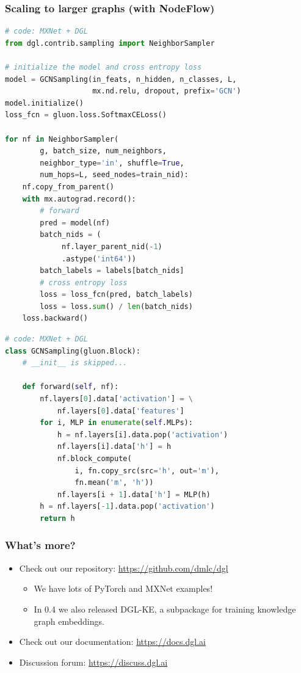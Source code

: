 \documentclass[10pt,aspectratio=169]{beamer}
\begin{document}
	\begin{frame}[fragile]
		\frametitle{Scaling to larger graphs (with NodeFlow)}
		\begin{minipage}{0.45\textwidth}
\begin{lstlisting}[language=Python]
# code: MXNet + DGL
from dgl.contrib.sampling import NeighborSampler

# initialize the model and cross entropy loss
model = GCNSampling(in_feats, n_hidden, n_classes, L,
                    mx.nd.relu, dropout, prefix='GCN')
model.initialize()
loss_fcn = gluon.loss.SoftmaxCELoss()

for nf in NeighborSampler(
        g, batch_size, num_neighbors,
        neighbor_type='in', shuffle=True,
        num_hops=L, seed_nodes=train_nid):
    nf.copy_from_parent()
    with mx.autograd.record():
        # forward
        pred = model(nf)
        batch_nids = (
             nf.layer_parent_nid(-1)
             .astype('int64'))
        batch_labels = labels[batch_nids]
        # cross entropy loss
        loss = loss_fcn(pred, batch_labels)
        loss = loss.sum() / len(batch_nids)
    loss.backward()
\end{lstlisting}
		\end{minipage}\hfill%
		\begin{minipage}{0.45\textwidth}
\begin{lstlisting}[language=Python]
# code: MXNet + DGL
class GCNSampling(gluon.Block):
    # __init__ is skipped...
    
    def forward(self, nf):
        nf.layers[0].data['activation'] = \
            nf.layers[0].data['features']
        for i, MLP in enumerate(self.MLPs):
            h = nf.layers[i].data.pop('activation')
            nf.layers[i].data['h'] = h
            nf.block_compute(
                i, fn.copy_src(src='h', out='m'),
                fn.mean('m', 'h'))
            nf.layers[i + 1].data['h'] = MLP(h)
        h = nf.layers[-1].data.pop('activation')
        return h
\end{lstlisting}
		\end{minipage}
	\end{frame}

	\begin{frame}
		\frametitle{What's more?}
		\begin{itemize}
			\item Check out our repository: \url{https://github.com/dmlc/dgl}
			\begin{itemize}
				\item We have lots of PyTorch and MXNet examples!
				\item In 0.4 we also released DGL-KE, a subpackage for training knowledge graph embeddings.
			\end{itemize}
			\item Check out our documentation: \url{https://docs.dgl.ai}
			\item Discussion forum: \url{https://discuss.dgl.ai}
		\end{itemize}
	\end{frame}
\end{document}
